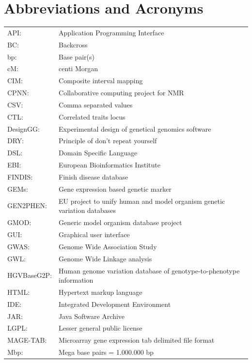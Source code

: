 \section{Abbreviations and Acronyms}
{\footnotesize
\begin{tabular}{ l l }
API:         & Application Programming Interface\\
BC:          & Backcross \\
bp:          & Base pair(s) \\
cM:          & centi Morgan \\
CIM:         & Composite interval mapping \\
CPNN:        & Collaborative computing project for NMR\\
CSV:         & Comma separated values\\
CTL:         & Correlated traits locus \\
DesignGG:    & Experimental design of genetical genomics software\\
DRY:         & Principle of don't repeat yourself\\
DSL:         & Domain Specific Language\\
EBI:         & European Bioinformatics Institute\\
FINDIS:      & Finish disease database\\
GEMs:        & Gene expression based genetic marker\\
GEN2PHEN:    & EU project to unify human and model organism genetic variation databases\\
GMOD:        & Generic model organism database project\\
GUI:         & Graphical user interface\\
GWAS:        & Genome Wide Association Study\\
GWL:         & Genome Wide Linkage analysis\\
HGVBaseG2P:  & Human genome variation database of genotype-to-phenotype information\\
HTML:        & Hypertext markup language\\
IDE:         & Integrated Development Environment\\
JAR:         & Java Software Archive\\
LGPL:        & Lesser general public license\\
MAGE-TAB:    & Microarray gene expression tab delimited file format\\
Mbp:         & Mega base pairs = 1.000.000 bp \\

\end{tabular}}
